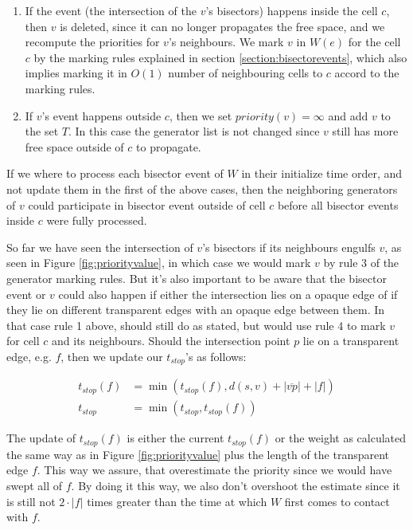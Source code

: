 \begin{enumerate}
    \item  If the event (the intersection of the $v$'s bisectors) happens inside the cell $c$, then $v$ is deleted, since it can no 
           longer propagates the free space, and we recompute the priorities for $v$'s neighbours. We mark $v$ in $W(e)$ for the cell 
           $c$ by the marking rules explained in section \ref{section:bisectorevents}, which also implies marking it in $O(1)$ number 
           of neighbouring cells to $c$ accord to the marking rules.
    \item If $v$'s event happens outside $c$, then we set $priority(v) = \infty$ and add $v$ to the set $T$. In this case the generator
          list is not changed since $v$ still has more free space outside of $c$ to propagate.
\end{enumerate}

If we where to process each bisector event of $W$ in their initialize time order, and not update them in the first of the above cases, 
then the neighboring generators of $v$ could participate in bisector event outside of cell $c$ before all bisector events inside $c$ 
were fully processed. 

So far we have seen the intersection of $v$'s bisectors if its neighbours engulfs $v$, as seen in Figure \ref{fig:priorityvalue}, in 
which case we would mark $v$ by rule 3 of the generator marking rules. But it's also important to be aware that the bisector event or 
$v$ could also happen if either the intersection lies on a opaque edge of if they lie on different transparent edges with an opaque 
edge between them. In that case rule 1 above, should still do as stated, but would use rule 4 to mark $v$ for cell $c$ and its 
neighbours. Should the intersection point $p$ lie on a transparent edge, e.g. $f$, then we update our $t_{stop}$'s as follows:

\begin{align*}
    t_{stop}(f) &= \min(t_{stop}(f), d(s,v) + |\overline{vp}| + |f|) \\
    t_{stop}    &= \min(t_{stop}, t_{stop}(f))
\end{align*}

The update of $t_{stop}(f)$ is either the current $t_{stop}(f)$ or the weight as calculated the same way as in Figure 
\ref{fig:priorityvalue} plus the length of the transparent edge $f$. This way we assure, that overestimate the priority 
since we would have swept all of $f$. By doing it this way, we also don't overshoot the estimate since it is still not 
$2\cdot|f|$ times greater than the time at which $W$ first comes to contact with $f$.

